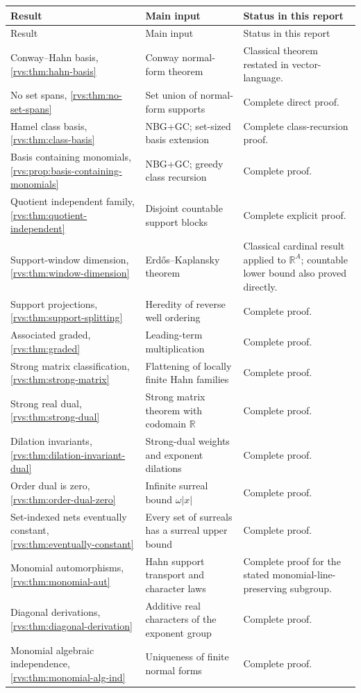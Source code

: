 \documentclass[11pt,letterpaper]{article}
\numberwithin{equation}{section}
\theoremstyle{definition}
\theoremstyle{remark}
\newcommand{\R}{\mathbb{R}}
\newcommand{\abs}[1]{\lvert #1\rvert}
\begin{document}
\begin{center}
\small
\begin{longtable}{L{0.26\textwidth}L{0.26\textwidth}L{0.36\textwidth}}
\toprule
Result & Main input & Status in this report\\
\midrule
\endfirsthead
\toprule
Result & Main input & Status in this report\\
\midrule
\endhead
Conway--Hahn basis, \cref{rvs:thm:hahn-basis} & Conway normal-form theorem &
Classical theorem restated in vector-language.\\
No set spans, \cref{rvs:thm:no-set-spans} & Set union of normal-form supports &
Complete direct proof.\\
Hamel class basis, \cref{rvs:thm:class-basis} & NBG+GC; set-sized basis extension &
Complete class-recursion proof.\\
Basis containing monomials,
\cref{rvs:prop:basis-containing-monomials} & NBG+GC; greedy class recursion &
Complete proof.\\
Quotient independent family,
\cref{rvs:thm:quotient-independent} & Disjoint countable support blocks &
Complete explicit proof.\\
Support-window dimension,
\cref{rvs:thm:window-dimension} & Erd\H{o}s--Kaplansky theorem & Classical cardinal
result applied to \(\R^A\); countable lower bound also proved directly.\\
Support projections, \cref{rvs:thm:support-splitting} & Heredity of reverse well
ordering & Complete proof.\\
Associated graded, \cref{rvs:thm:graded} & Leading-term multiplication & Complete
proof.\\
Strong matrix classification,
\cref{rvs:thm:strong-matrix} & Flattening of locally finite Hahn families &
Complete proof.\\
Strong real dual, \cref{rvs:thm:strong-dual} & Strong matrix theorem with
codomain \(\R\) & Complete proof.\\
Dilation invariants,
\cref{rvs:thm:dilation-invariant-dual} & Strong-dual weights and exponent
dilations & Complete proof.\\
Order dual is zero,
\cref{rvs:thm:order-dual-zero} & Infinite surreal bound \(\omega\abs{x}\) &
Complete proof.\\
Set-indexed nets eventually constant,
\cref{rvs:thm:eventually-constant} & Every set of surreals has a surreal upper
bound & Complete proof.\\
Monomial automorphisms,
\cref{rvs:thm:monomial-aut} & Hahn support transport and character laws & Complete
proof for the stated monomial-line-preserving subgroup.\\
Diagonal derivations,
\cref{rvs:thm:diagonal-derivation} & Additive real characters of the exponent
group & Complete proof.\\
Monomial algebraic independence,
\cref{rvs:thm:monomial-alg-ind} & Uniqueness of finite normal forms & Complete
proof.\\
\bottomrule
\end{longtable}
\end{center}
\end{document}
